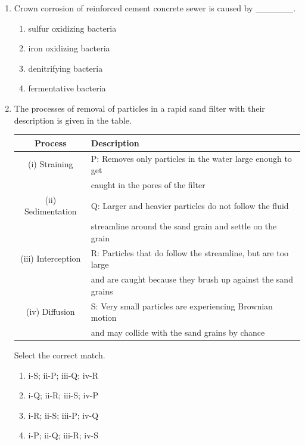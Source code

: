 \documentclass[journal]{IEEEtran}
\begin{document}
\begin{enumerate}
\item Crown corrosion of reinforced cement concrete sewer is caused by \_\_\_\_\_\_.
\hfill{}

\begin{multicols}{2}
\begin{enumerate}
\item sulfur oxidizing bacteria
\item iron oxidizing bacteria
\item denitrifying bacteria
\item fermentative bacteria
\end{enumerate}
\end{multicols}

\item The processes of removal of particles in a rapid sand filter with their description is given in the table.

\begin{center}

\renewcommand{\arraystretch}{1.2}

\begin{tabular}{|c|p{9cm}|}
\hline
\textbf{Process} & \textbf{Description} \\
\hline
(i) Straining & P: Removes only particles in the water large enough to get \\ & caught in the pores of the filter \\
\hline
(ii) Sedimentation & Q: Larger and heavier particles do not follow the fluid \\& streamline around the sand grain and settle on the grain \\
\hline
(iii) Interception & R: Particles that do follow the streamline, but are too large \\& and are caught because they brush up against the sand grains \\
\hline
(iv) Diffusion & S: Very small particles are experiencing Brownian motion \\& and may collide with the sand grains by chance \\
\hline
\end{tabular}
\end{center}

Select the correct match.
\hfill{}

\begin{multicols}{2}
\begin{enumerate}
\item i-S; ii-P; iii-Q; iv-R
\item i-Q; ii-R; iii-S; iv-P
\item i-R; ii-S; iii-P; iv-Q
\item i-P; ii-Q; iii-R; iv-S
\end{enumerate}
\end{multicols}


\end{enumerate}
\end{document}
